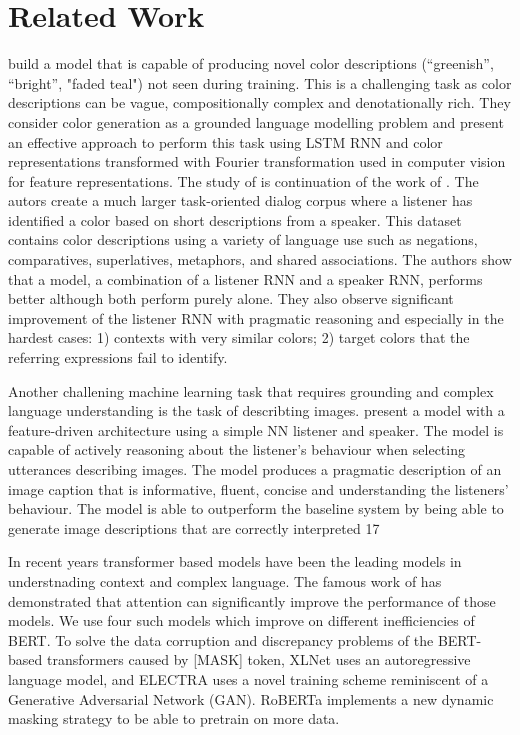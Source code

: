 \section{Related Work}

\citep{monroe-2016-compositional} build a model that is capable of producing novel color descriptions (“greenish”, “bright”, "faded teal") not seen during training. This is a challenging task as color descriptions can be vague, compositionally complex and denotationally rich. They consider color generation as a grounded language modelling problem and present an effective approach to perform this task using LSTM RNN and color representations transformed with Fourier transformation used in computer vision for feature representations. The study of \citep{monroe-2017-colors} is continuation of the work of \citep{monroe-2016-compositional}. The autors create a much larger task-oriented dialog corpus \citep{moroe-2017-colors-reference-dataset} where a listener has identified a color based on short descriptions from a speaker. This dataset contains color descriptions using a variety of language use such as negations, comparatives, superlatives, metaphors, and shared associations. The authors show that a model, a combination of a listener RNN and a speaker RNN, performs better although both perform purely alone. They also observe significant improvement of the listener RNN with pragmatic reasoning and especially in the hardest cases: 1) contexts with very similar colors; 2) target colors that the referring expressions fail to identify.

\par
Another challening machine learning task that requires grounding and complex language understanding is the task of describting images. \citep{andreas-2016-reasoning} present a model with a feature-driven architecture using a simple NN listener and speaker. The model is capable of actively reasoning about the listener’s behaviour when selecting utterances describing images. The model produces a pragmatic description of an image caption that is informative, fluent, concise and understanding the listeners’ behaviour. The model is able to outperform the baseline system by being able to generate image descriptions that are correctly interpreted 17%

\par
In recent years transformer based models have been the leading models in understnading context and complex language. The famous work of \citep{vaswani-2017-attention} has demonstrated that attention can significantly improve the performance of those models. We use four such models which improve on different inefficiencies of BERT. To solve the data corruption and discrepancy problems of the BERT-based transformers caused by [MASK] token, XLNet \citep{yang-2019-xlnet} uses an autoregressive language model, and ELECTRA \citep{clark-2020-electra} uses a novel training scheme reminiscent of a Generative Adversarial Network (GAN). RoBERTa \citep{liu-2019-roberta} implements a new dynamic masking strategy to be able to pretrain on more data.

